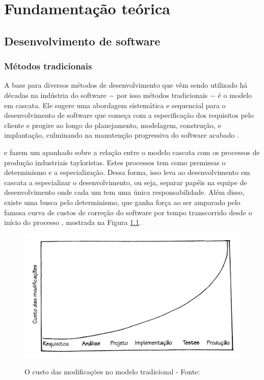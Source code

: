 \chapter{Fundamentação teórica}

\section{Desenvolvimento de software} %
\label{sec:desenvolvimento_de_software}


\subsection{Métodos tradicionais} %
\label{sub:metodos_tradicionais}

A base para diversos métodos de desenvolvimento que vêm sendo utilizado há décadas na indústria do software $-$ por isso métodos tradicionais $-$ é o modelo em cascata. Ele sugere uma abordagem sistemática e sequencial para o desenvolvimento de software que começa com a especificação dos requisitos pelo cliente e progire ao longo do planejamento, modelagem, construção, e implantação, culminando na manutenção progressiva do software acabado \cite{Pressman}.

 e  fazem um apanhado sobre a relação entre o modelo cascata com os processos de produção industriais tayloristas. Estes processos tem como premissas o determinismo e a especialização. Dessa forma, isso leva ao desenvolvimento em cascata a especializar o desenvolvimento, ou seja, separar papéis na equipe de desenvolvimento onde cada um tem uma única responsabilidade. Além disso, existe uma busca pelo determinismo, que ganha força ao ser amparado pelo famosa curva de custos de correção do software por tempo transcorrido desde o início do processo \cite{Boehm}, mostrada na Figura \ref{img:custo-cascata}.

\begin{figure}[h]
  \center
  \caption{O custo das modificações no modelo tradicional - Fonte: \cite{XPKent}}
  \includegraphics[scale=0.35]{images/custo-cascata}
  \label{img:custo-cascata}
\end{figure}

